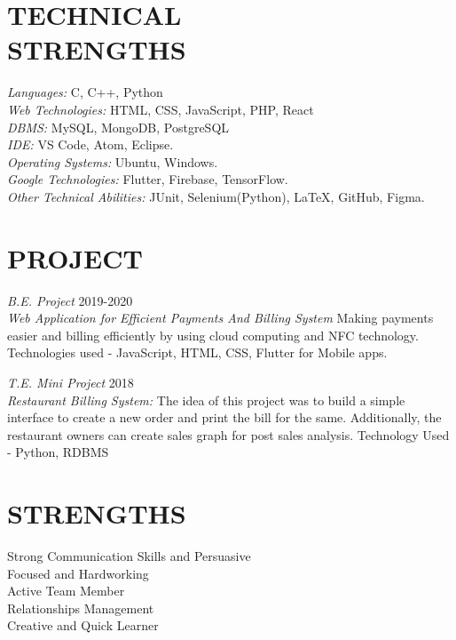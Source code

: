 \documentclass[margin, 12pt]{res} %
\begin{document}
\begin{resume}
\section{TECHNICAL \\ STRENGTHS} 

{\sl Languages:} C, C++, Python \\
{\sl Web Technologies:} HTML, CSS, JavaScript, PHP, React\\
{\sl DBMS:} MySQL, MongoDB, PostgreSQL\\
{\sl IDE:} VS Code, Atom, Eclipse.\\
{\sl Operating Systems:} Ubuntu, Windows.\\
{\sl Google Technologies:} Flutter, Firebase, TensorFlow. \\
{\sl Other Technical Abilities:} JUnit, Selenium(Python), LaTeX, GitHub, Figma.
 
 
\section{PROJECT}
{\sl B.E. Project} \hfill 2019-2020 \\
{\sl Web Application for Efficient Payments And Billing System }
Making payments easier and billing efficiently by using cloud computing and NFC technology. Technologies used - JavaScript, HTML, CSS, Flutter for Mobile apps.

{\sl T.E. Mini Project} \hfill 2018 \\
{\sl Restaurant Billing System:}
The idea of this project was to build a simple interface to create a new order and print the bill for the same. Additionally, the restaurant owners can create sales graph for post sales analysis. Technology Used - Python, RDBMS


\section{STRENGTHS}

Strong Communication Skills and Persuasive\\
Focused and Hardworking\\
Active Team Member\\
Relationships Management\\
Creative and Quick Learner


\end{resume}
\end{document}
